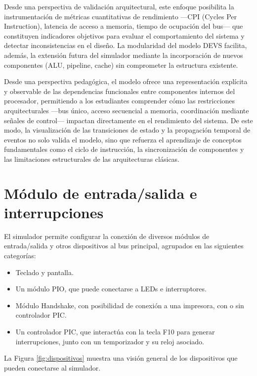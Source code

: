 \documentclass[12pt,oneside]{templates/unerthesis}
\begin{document}
Desde una perspectiva de validación arquitectural, este enfoque posibilita la instrumentación de métricas cuantitativas de rendimiento ---CPI (Cycles Per Instruction), latencia de acceso a memoria, tiempo de ocupación del bus--- que constituyen indicadores objetivos para evaluar el comportamiento del sistema y detectar inconsistencias en el diseño. La modularidad del modelo DEVS facilita, además, la extensión futura del simulador mediante la incorporación de nuevos componentes (ALU, pipeline, cache) sin comprometer la estructura existente.

Desde una perspectiva pedagógica, el modelo ofrece una representación explícita y observable de las dependencias funcionales entre componentes internos del procesador, permitiendo a los estudiantes comprender cómo las restricciones arquitecturales ---bus único, acceso secuencial a memoria, coordinación mediante señales de control--- impactan directamente en el rendimiento del sistema. De este modo, la visualización de las transiciones de estado y la propagación temporal de eventos no solo valida el modelo, sino que refuerza el aprendizaje de conceptos fundamentales como el ciclo de instrucción, la sincronización de componentes y las limitaciones estructurales de las arquitecturas clásicas.

\hypertarget{muxf3dulo-de-entradasalida-e-interrupciones}{%
\section{Módulo de entrada/salida e interrupciones}\label{muxf3dulo-de-entradasalida-e-interrupciones}}

El simulador permite configurar la conexión de diversos módulos de entrada/salida y otros dispositivos al bus principal, agrupados en las siguientes categorías:

\begin{itemize}
\item
  Teclado y pantalla.
\item
  Un módulo PIO, que puede conectarse a LEDs e interruptores.
\item
  Módulo Handshake, con posibilidad de conexión a una impresora, con o sin controlador PIC.
\item
  Un controlador PIC, que interactúa con la tecla F10 para generar interrupciones, junto con un temporizador y su reloj asociado.
\end{itemize}

La Figura \ref{fig:dispositivos} muestra una visión general de los dispositivos que pueden conectarse al simulador.
\end{document}
